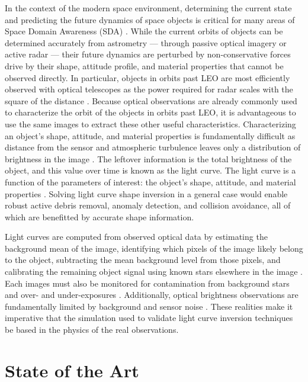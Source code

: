 In the context of the modern space environment, determining the current state and predicting the future dynamics of space objects is critical for many areas of Space Domain Awareness (SDA) \cite{frueh2019notes}. While the current orbits of objects can be determined accurately from astrometry --- through passive optical imagery or active radar --- their future dynamics are perturbed by non-conservative forces drive by their shape, attitude profile, and material properties that cannot be observed directly. In particular, objects in orbits past LEO are most efficiently observed with optical telescopes as the power required for radar scales with the square of the distance \cite{frueh2019notes}. Because optical observations are already commonly used to characterize the orbit of the objects in orbits past LEO, it is advantageous to use the same images to extract these other useful characteristics. Characterizing an object's shape, attitude, and material properties is fundamentally difficult as distance from the sensor and atmospheric turbulence leaves only a distribution of brightness in the image \cite{fan2020thesis}. The leftover information is the total brightness of the object, and this value over time is known as the light curve. The light curve is a function of the parameters of interest: the object's shape, attitude, and material properties \cite{fan2020thesis, burton2021mapping}. Solving light curve shape inversion in a general case would enable robust active debris removal, anomaly detection, and collision avoidance, all of which are benefitted by accurate shape information.

Light curves are computed from observed optical data by estimating the background mean of the image, identifying which pixels of the image likely belong to the object, subtracting the mean background level from those pixels, and calibrating the remaining object signal using known stars elsewhere in the image \cite{schildknecht2008}. Each images must also be monitored for contamination from background stars and over- and under-exposures \cite{schildknecht2015}. Additionally, optical brightness observations are fundamentally limited by background and sensor noise \cite{frueh2019notes}. These realities make it imperative that the simulation used to validate light curve inversion techniques be based in the physics of the real observations.

\section{State of the Art}

